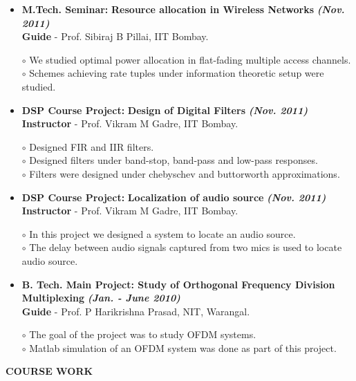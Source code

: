 \documentclass[a4paper,10pt]{article}
\begin{document}
\begin{itemize}
 \item \textbf{M.Tech. Seminar:} \textbf{Resource allocation in Wireless Networks}  \textbf \emph{(Nov. 2011)}\\
        {\textbf{Guide} - Prof. Sibiraj B Pillai, IIT Bombay.   }

      $\circ$ We studied optimal power allocation in flat-fading multiple access channels. \\
      $\circ$ Schemes achieving rate tuples under information theoretic setup were studied.
             
 \item \textbf{DSP Course Project:} \textbf{Design of Digital Filters} \textbf \emph{(Nov. 2011)}\\
	{\textbf{Instructor} - Prof. Vikram M Gadre, IIT Bombay. }
	
	$\circ$ Designed FIR and IIR filters. \\
	$\circ$ Designed filters under band-stop, band-pass and low-pass responses. \\
	$\circ$ Filters were designed under chebyschev and buttorworth approximations.
	
 \item \textbf{DSP Course Project:} \textbf{Localization of audio source} \textbf \emph{(Nov. 2011)}\\
	{\textbf{Instructor} - Prof. Vikram M Gadre, IIT Bombay. }
	
	$\circ$ In this project we designed a system to locate an audio source. \\
	$\circ$ The delay between audio signals captured from two mics is used to locate audio source.

  \item \textbf{{B. Tech. Main Project}: Study of Orthogonal Frequency Division Multiplexing}  \textbf \emph{(Jan. - June 2010)}\\
        {\textbf{Guide} - Prof. P Harikrishna Prasad, NIT, Warangal. }
        
$\circ$ The goal of the project was to study OFDM systems. \\
$\circ$ Matlab simulation of an OFDM system was done as part of this project.

 \end{itemize}

 \colorbox{titleColor}{\parbox{6.5in}{\textbf{COURSE WORK}}}
\end{document}
